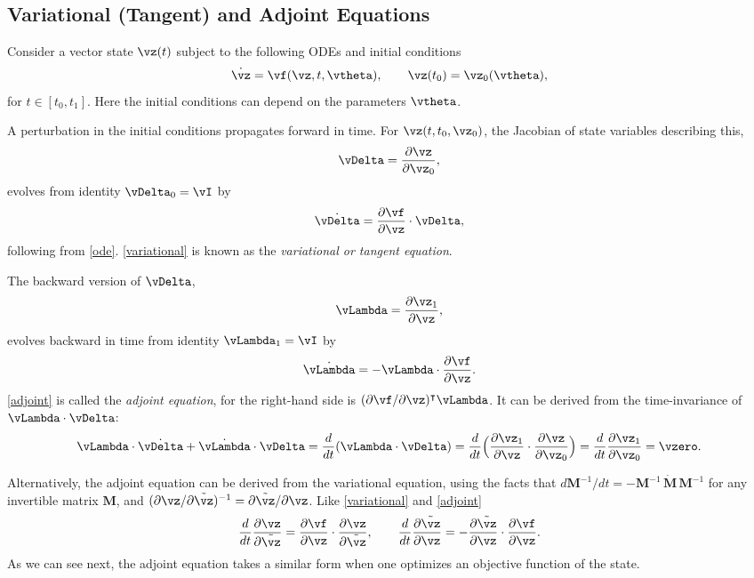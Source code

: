 \documentclass[modern, dvipsnames]{aastex631}
\renewcommand{\d}{d}
\newcommand{\p}{\partial}
\begin{document}
\vspace{1em}
\subsection{Variational (Tangent) and Adjoint Equations}

Consider a vector state $\vz(t)$ subject to the following ODEs and
initial conditions
%
\begin{equation}
\dot\vz = \vf(\vz, t, \vtheta),
\qquad
\vz(t_0) = \vz_0(\vtheta),
\label{ode}
\end{equation}
%
for $t \in [t_0, t_1]$.
Here the initial conditions can depend on the parameters $\vtheta$.

A perturbation in the initial conditions propagates forward in time.
For $\vz(t, t_0, \vz_0)$, the Jacobian of state variables describing
this,
%
\begin{equation}
\vDelta = \frac{\p\vz}{\p\vz_0},
\end{equation}
%
evolves from identity $\vDelta_0 = \vI$ by
%
\begin{equation}
\dot\vDelta = \frac{\p\vf}{\p\vz} \cdot \vDelta,
\label{variational}
\end{equation}
%
following from \eqref{ode}.
\eqref{variational} is known as the \emph{variational or tangent
equation}.

The backward version of $\vDelta$,
%
\begin{equation}
\vLambda = \frac{\p\vz_1}{\p\vz},
\end{equation}
%
evolves backward in time from identity $\vLambda_1 = \vI$ by
%
\begin{equation}
\dot\vLambda = - \vLambda \cdot \frac{\p\vf}{\p\vz}.
\label{adjoint}
\end{equation}
%
\eqref{adjoint} is called the \emph{adjoint equation}, for the
right-hand side is $(\p\vf / \p\vz)^\intercal \vLambda$.
It can be derived from the time-invariance of $\vLambda \cdot \vDelta$:
%
\begin{equation}
\vLambda \cdot \dot\vDelta + \dot\vLambda \cdot \vDelta
= \frac\d{\d t} (\vLambda \cdot \vDelta)
= \frac\d{\d t} \Bigl( \frac{\p\vz_1}{\p\vz}
  \cdot \frac{\p\vz}{\p\vz_0} \Bigr)
= \frac\d{\d t} \frac{\p\vz_1}{\p\vz_0}
= \vzero.
\end{equation}

Alternatively, the adjoint equation can be derived from the variational
equation, using the facts that $\d \bm{M}^{-1} / \d t = - \bm{M}^{-1} \,
\dot{\bm{M}} \, \bm{M}^{-1}$ for any invertible matrix $\bm{M}$, and
$(\p\vz / \p\tilde\vz)^{-1} = \p\tilde\vz / \p\vz$.
Like \eqref{variational} and \eqref{adjoint}
%
\begin{equation}
\frac\d{\d t} \frac{\p\vz}{\p\tilde\vz}
= \frac{\p\vf}{\p\vz} \cdot \frac{\p\vz}{\p\tilde\vz},
\qquad
\frac\d{\d t} \frac{\p\tilde\vz}{\p\vz}
= - \frac{\p\tilde\vz}{\p\vz} \cdot \frac{\p\vf}{\p\vz}.
\end{equation}
%
As we can see next, the adjoint equation takes a similar form when one
optimizes an objective function of the state.
\end{document}
